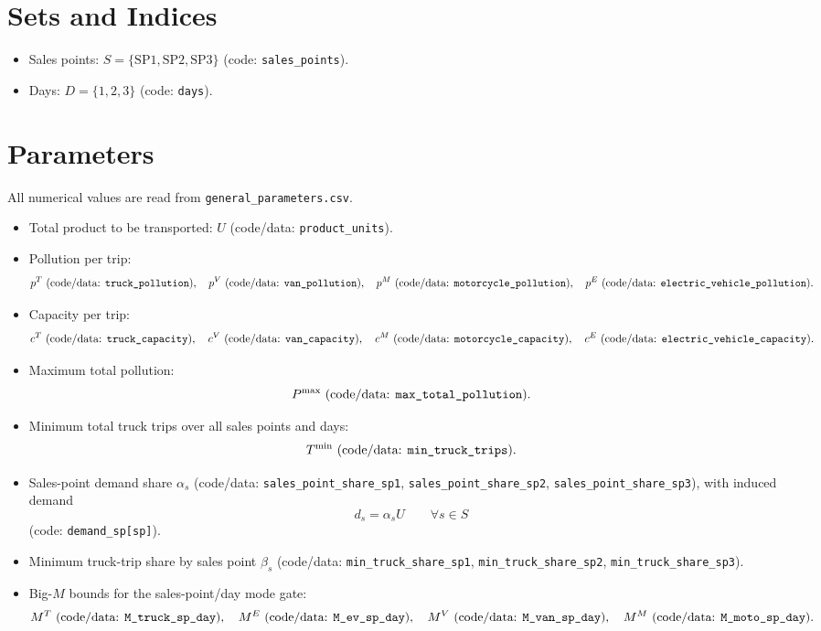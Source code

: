 \section*{Sets and Indices}

\begin{itemize}
    \item Sales points: \(S=\{\mathrm{SP1},\mathrm{SP2},\mathrm{SP3}\}\) (code: \texttt{sales\_points}).
    \item Days: \(D=\{1,2,3\}\) (code: \texttt{days}).
\end{itemize}

\section*{Parameters}

All numerical values are read from \texttt{general\_parameters.csv}.

\begin{itemize}
    \item Total product to be transported: \(U\) (code/data: \texttt{product\_units}).
    \item Pollution per trip:
    \[
    p^{T}\ \text{(code/data: \texttt{truck\_pollution})},\quad
    p^{V}\ \text{(code/data: \texttt{van\_pollution})},\quad
    p^{M}\ \text{(code/data: \texttt{motorcycle\_pollution})},\quad
    p^{E}\ \text{(code/data: \texttt{electric\_vehicle\_pollution})}.
    \]
    \item Capacity per trip:
    \[
    c^{T}\ \text{(code/data: \texttt{truck\_capacity})},\quad
    c^{V}\ \text{(code/data: \texttt{van\_capacity})},\quad
    c^{M}\ \text{(code/data: \texttt{motorcycle\_capacity})},\quad
    c^{E}\ \text{(code/data: \texttt{electric\_vehicle\_capacity})}.
    \]
    \item Maximum total pollution:
    \[
    P^{\max}\ \text{(code/data: \texttt{max\_total\_pollution})}.
    \]
    \item Minimum total truck trips over all sales points and days:
    \[
    T^{\min}\ \text{(code/data: \texttt{min\_truck\_trips})}.
    \]
    \item Sales-point demand share \(\alpha_s\) (code/data: \texttt{sales\_point\_share\_sp1}, \texttt{sales\_point\_share\_sp2}, \texttt{sales\_point\_share\_sp3}), with induced demand
    \[
    d_s = \alpha_s U \qquad \forall s\in S
    \]
    (code: \texttt{demand\_sp[sp]}).
    \item Minimum truck-trip share by sales point \(\beta_s\) (code/data: \texttt{min\_truck\_share\_sp1}, \texttt{min\_truck\_share\_sp2}, \texttt{min\_truck\_share\_sp3}).
    \item Big-\(M\) bounds for the sales-point/day mode gate:
    \[
    M^T \text{ (code/data: \texttt{M\_truck\_sp\_day})},\quad
    M^E \text{ (code/data: \texttt{M\_ev\_sp\_day})},\quad
    M^V \text{ (code/data: \texttt{M\_van\_sp\_day})},\quad
    M^M \text{ (code/data: \texttt{M\_moto\_sp\_day})}.
    \]
\end{itemize}

